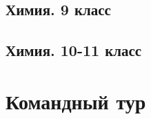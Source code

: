 \documentclass[a4paper,12pt,oneside]{book}
\begin{document}
\section{Химия. 9 класс}


\section{Химия. 10-11 класс}


\chapter{Командный тур}



\end{document}

